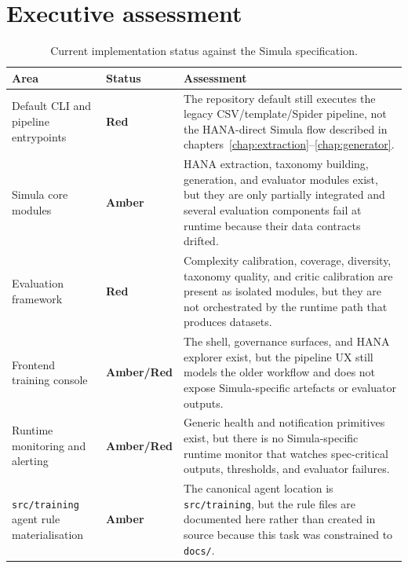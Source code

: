 \section{Executive assessment}
\begin{table}[htbp]
\centering
\footnotesize
\caption{Current implementation status against the Simula specification.}
\label{tab:simula-gap-summary}
\begin{tabularx}{\textwidth}{@{}l l X@{}}
\toprule
\textbf{Area} & \textbf{Status} & \textbf{Assessment} \\
\midrule
Default CLI and pipeline entrypoints & \textbf{Red} & The repository default still executes the legacy CSV/template/Spider pipeline, not the HANA-direct Simula flow described in chapters~\ref{chap:extraction}--\ref{chap:generator}. \\
Simula core modules & \textbf{Amber} & HANA extraction, taxonomy building, generation, and evaluator modules exist, but they are only partially integrated and several evaluation components fail at runtime because their data contracts drifted. \\
Evaluation framework & \textbf{Red} & Complexity calibration, coverage, diversity, taxonomy quality, and critic calibration are present as isolated modules, but they are not orchestrated by the runtime path that produces datasets. \\
Frontend training console & \textbf{Amber/Red} & The shell, governance surfaces, and HANA explorer exist, but the pipeline UX still models the older workflow and does not expose Simula-specific artefacts or evaluator outputs. \\
Runtime monitoring and alerting & \textbf{Amber/Red} & Generic health and notification primitives exist, but there is no Simula-specific runtime monitor that watches spec-critical outputs, thresholds, and evaluator failures. \\
\texttt{src/training} agent rule materialisation & \textbf{Amber} & The canonical agent location is \texttt{src/training}, but the rule files are documented here rather than created in source because this task was constrained to \texttt{docs/}. \\
\bottomrule
\end{tabularx}
\end{table}

